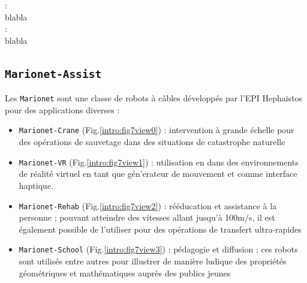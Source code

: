  :\\

blabla \\

 :\\

blabla \\


\subsection{{\tt Marionet-Assist}} \label{chap0-1-1}

Les {\tt Marionet} sont une classe de robots à câbles développés par l'EPI 
Hephaistos pour des applications diverses \cite{merlet2010marionet} :
\begin{itemize}
 \item {\tt Marionet-Crane} (Fig.\ref{intro:fig7view0}) : intervention à grande 
échelle pour des opé\-rations de sauvetage dans des situations de catastrophe 
naturelle
 \item {\tt Marionet-VR} (Fig.\ref{intro:fig7view1}) : utilisation en dans des 
environnements de r\'ealit\'e virtuel en tant que g\'en'erateur de mouvement et 
comme interface haptique. 
 \item {\tt Marionet-Rehab} (Fig.\ref{intro:fig7view2}) : rééducation et 
assistance à la personne ; pouvant atteindre des vitesses allant jusqu'à 
100m/s, 
il est également possible de l'utiliser pour des opérations de transfert 
ultra-rapides
 \item {\tt Marionet-School} (Fig.\ref{intro:fig7view3}) : pédagogie et 
diffusion ; ces robots sont utilisés entre autres pour illustrer de manière 
ludique des propriétés géomé\-triques et mathématiques auprès des publics jeunes
\end{itemize}

